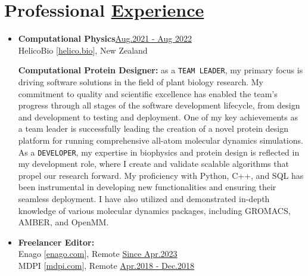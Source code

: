 
\section{Professional \href{.}{Experience}}

\begin{itemize}


    \item {\bf Computational Physics}\hfill \href{.}{Aug.2021 - Aug 2022}\\
          HelicoBio [\href{www.helico.bio}{helico.bio}],
          New Zealand

              {\noindent
                  \textbf{Computational Protein Designer:}
                  as a \texttt{TEAM LEADER}, my primary focus is driving software solutions in the field of plant biology research. My commitment to quality and scientific excellence has enabled the team's progress through all stages of the software development lifecycle, from design and development to testing and deployment. One of my key achievements as a team leader is successfully leading the creation of a novel protein design platform for running comprehensive all-atom molecular dynamics simulations.
                  As a \texttt{DEVELOPER}, my expertise in biophysics and protein design is reflected in my development role, where I create and validate scalable algorithms that propel our research forward. My proficiency with Python, C++, and SQL has been instrumental in developing new functionalities and ensuring their seamless deployment. I have also utilized and demonstrated in-depth knowledge of various molecular dynamics packages, including GROMACS, AMBER, and OpenMM.
              }

    \item {\bf Freelancer Editor:}\\
          Enago [\href{https://www.enago.com/}{enago.com}], Remote \hfill
          \href{.}{Since Apr.2023}\\
          MDPI [\href{https://www.mdpi.com/}{mdpi.com}], Remote \hfill
          \href{.}{Apr.2018 - Dec.2018}


\end{itemize}
